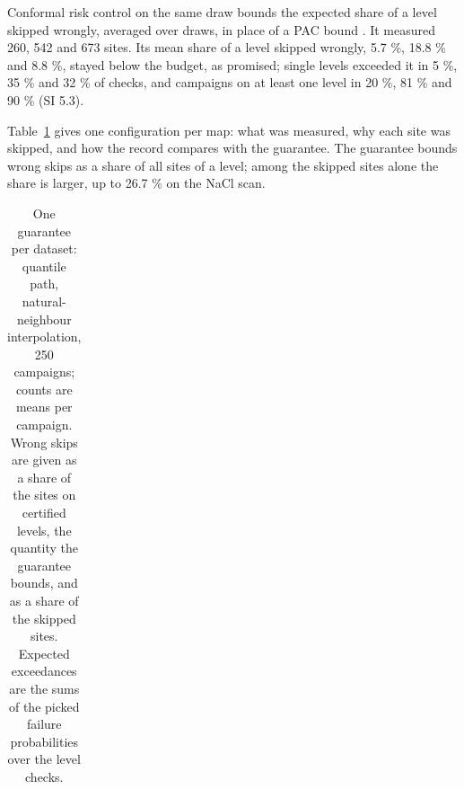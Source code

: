 \documentclass{iopjournal}
\begin{document}
Conformal risk control on the same draw bounds the expected share of a level skipped wrongly, averaged over draws, in place of a PAC bound \cite{Angelopoulos2024}. It measured 260, 542 and 673 sites. Its mean share of a level skipped wrongly, 5.7 \%, 18.8 \% and 8.8 \%, stayed below the budget, as promised; single levels exceeded it in 5 \%, 35 \% and 32 \% of checks, and campaigns on at least one level in 20 \%, 81 \% and 90 \% (SI 5.3).

Table~\ref{tab:3} gives one configuration per map: what was measured, why each site was skipped, and how the record compares with the guarantee. The guarantee bounds wrong skips as a share of all sites of a level; among the skipped sites alone the share is larger, up to 26.7 \% on the NaCl scan.

{\small
\begin{longtable}[]{@{}
  >{\raggedright\arraybackslash}p{}
  >{\raggedright\arraybackslash}p{}
  >{\raggedright\arraybackslash}p{}
  >{\raggedright\arraybackslash}p{}
  >{\raggedright\arraybackslash}p{}
  >{\raggedright\arraybackslash}p{}
  >{\raggedright\arraybackslash}p{}@{}}
\caption{One guarantee per dataset: quantile path, natural-neighbour interpolation, 250 campaigns; counts are means per campaign. Wrong skips are given as a share of the sites on certified levels, the quantity the guarantee bounds, and as a share of the skipped sites. Expected exceedances are the sums of the picked failure probabilities over the level checks.}\label{tab:3}\\


\end{longtable}}
\end{document}
